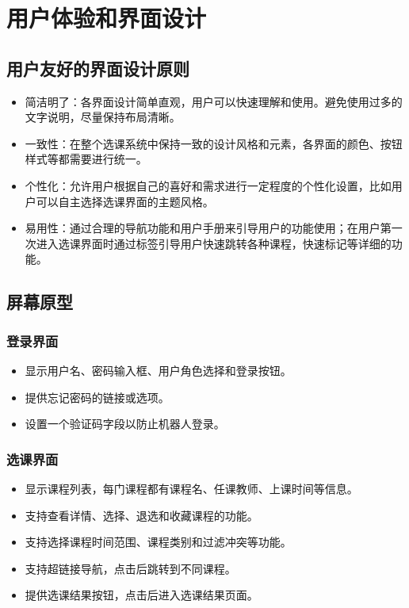 \documentclass{article}
\begin{document}
\section{用户体验和界面设计}
\subsection{用户友好的界面设计原则}
\begin{itemize}
	\item 简洁明了：各界面设计简单直观，用户可以快速理解和使用。避免使用过多的文字说明，尽量保持布局清晰。
	\item 一致性：在整个选课系统中保持一致的设计风格和元素，各界面的颜色、按钮样式等都需要进行统一。
	\item 个性化：允许用户根据自己的喜好和需求进行一定程度的个性化设置，比如用户可以自主选择选课界面的主题风格。
	\item 易用性：通过合理的导航功能和用户手册来引导用户的功能使用；在用户第一次进入选课界面时通过标签引导用户快速跳转各种课程，快速标记等详细的功能。
\end{itemize}

\subsection{屏幕原型}
\subsubsection{登录界面}
\begin{itemize}
	\item 显示用户名、密码输入框、用户角色选择和登录按钮。
	\item 提供忘记密码的链接或选项。
	\item 设置一个验证码字段以防止机器人登录。
\end{itemize}

\subsubsection{选课界面}
\begin{itemize}
	\item 显示课程列表，每门课程都有课程名、任课教师、上课时间等信息。
	\item 支持查看详情、选择、退选和收藏课程的功能。
	\item 支持选择课程时间范围、课程类别和过滤冲突等功能。
	\item 支持超链接导航，点击后跳转到不同课程。
	\item 提供选课结果按钮，点击后进入选课结果页面。
\end{itemize}
\end{document}
